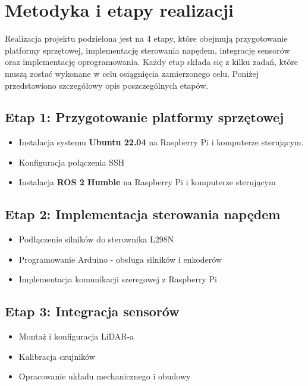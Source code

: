 \documentclass[a4paper,twoside,12pt]{book}
\begin{document}
\section{Metodyka i etapy realizacji}
Realizacja projektu podzielona jest na 4 etapy, które obejmują przygotowanie platformy sprzętowej, implementację sterowania napędem, integrację sensorów oraz implementację oprogramowania. Każdy etap składa się z kilku zadań, które muszą zostać wykonane w celu osiągnięcia zamierzonego celu. Poniżej przedstawiono szczegółowy opis poszczególnych etapów.

\subsection{Etap 1: Przygotowanie platformy sprzętowej}
\begin{itemize}
\item Instalacja systemu \textbf{Ubuntu 22.04} na Raspberry Pi i komputerze sterującym.
\item Konfiguracja połączenia SSH
\item Instalacja \textbf{ROS 2 Humble} na Raspberry Pi i komputerze sterującym
\end{itemize}

\subsection{Etap 2: Implementacja sterowania napędem}
\begin{itemize}
\item Podłączenie silników do sterownika L298N
\item Programowanie Arduino - obsługa silników i enkoderów
\item Implementacja komunikacji szeregowej z Raspberry Pi
\end{itemize}

\subsection{Etap 3: Integracja sensorów}
\begin{itemize}
\item Montaż i konfiguracja LiDAR-a
\item Kalibracja czujników
\item Opracowanie układu mechanicznego i obudowy
\end{itemize}
\end{document}
